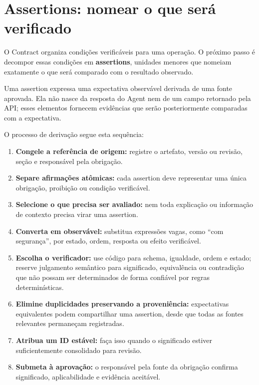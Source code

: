\documentclass[
  10pt,
  a4paper,
  oneside]{book}
\providecommand{\tightlist}{%
  \setlength{\itemsep}{0pt}\setlength{\parskip}{0pt}}
\begin{document}
\hypertarget{assertions-nomear-o-que-seruxe1-verificado}{%
\section{Assertions: nomear o que será
verificado}\label{assertions-nomear-o-que-seruxe1-verificado}}

O Contract organiza condições verificáveis para uma operação. O próximo
passo é decompor essas condições em \textbf{assertions}, unidades
menores que nomeiam exatamente o que será comparado com o resultado
observado.

Uma assertion expressa uma expectativa observável derivada de uma fonte
aprovada. Ela não nasce da resposta do Agent nem de um campo retornado
pela API; esses elementos fornecem evidências que serão posteriormente
comparadas com a expectativa.

O processo de derivação segue esta sequência:

\begin{enumerate}
\def\labelenumi{\arabic{enumi}.}
\tightlist
\item
  \textbf{Congele a referência de origem:} registre o artefato, versão
  ou revisão, seção e responsável pela obrigação.
\item
  \textbf{Separe afirmações atômicas:} cada assertion deve representar
  uma única obrigação, proibição ou condição verificável.
\item
  \textbf{Selecione o que precisa ser avaliado:} nem toda explicação ou
  informação de contexto precisa virar uma assertion.
\item
  \textbf{Converta em observável:} substitua expressões vagas, como
  ``com segurança'', por estado, ordem, resposta ou efeito verificável.
\item
  \textbf{Escolha o verificador:} use código para schema, igualdade,
  ordem e estado; reserve julgamento semântico para significado,
  equivalência ou contradição que não possam ser determinados de forma
  confiável por regras determinísticas.
\item
  \textbf{Elimine duplicidades preservando a proveniência:} expectativas
  equivalentes podem compartilhar uma assertion, desde que todas as
  fontes relevantes permaneçam registradas.
\item
  \textbf{Atribua um ID estável:} faça isso quando o significado estiver
  suficientemente consolidado para revisão.
\item
  \textbf{Submeta à aprovação:} o responsável pela fonte da obrigação
  confirma significado, aplicabilidade e evidência aceitável.
\end{enumerate}
\end{document}
